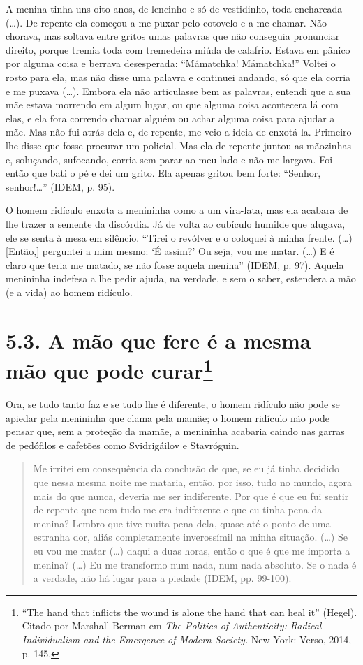 A menina tinha uns oito anos, de lencinho e só de vestidinho, toda
encharcada (\ldots{}). De repente ela começou a me puxar pelo cotovelo e
a me chamar. Não chorava, mas soltava entre gritos umas palavras que não
conseguia pronunciar direito, porque tremia toda com tremedeira miúda de
calafrio. Estava em pânico por alguma coisa e berrava desesperada:
``Mámatchka! Mámatchka!'' Voltei o rosto para ela, mas não disse uma
palavra e continuei andando, só que ela corria e me puxava (\ldots{}).
Embora ela não articulasse bem as palavras, entendi que a sua mãe estava
morrendo em algum lugar, ou que alguma coisa acontecera lá com elas, e
ela fora correndo chamar alguém ou achar alguma coisa para ajudar a mãe.
Mas não fui atrás dela e, de repente, me veio a ideia de enxotá-la.
Primeiro lhe disse que fosse procurar um policial. Mas ela de repente
juntou as mãozinhas e, soluçando, sufocando, corria sem parar ao meu
lado e não me largava. Foi então que bati o pé e dei um grito. Ela
apenas gritou bem forte: ``Senhor, senhor!\ldots{}'' (IDEM, p. 95).

O homem ridículo enxota a menininha como a um vira-lata, mas ela acabara
de lhe trazer a semente da discórdia. Já de volta ao cubículo humilde
que alugava, ele se senta à mesa em silêncio. ``Tirei o revólver e o
coloquei à minha frente. (\ldots{}) {[}Então,{]} perguntei a mim mesmo:
`É assim?' Ou seja, vou me matar. (\ldots{}) E é claro que teria me
matado, se não fosse aquela menina'' (IDEM, p. 97). Aquela menininha
indefesa a lhe pedir ajuda, na verdade, e sem o saber, estendera a mão
(e a vida) ao homem ridículo.

\section{5.3. A mão que fere é a mesma mão que pode curar\protect\footnote{``The hand that inflicts the wound is alone the hand that can heal it'' (Hegel). Citado por Marshall Berman em \emph{The Politics of Authenticity: Radical Individualism and the Emergence of Modern Society.} New York: Verso, 2014, p. 145.}}

Ora, se tudo tanto faz e se tudo lhe é diferente, o homem ridículo não
pode se apiedar pela menininha que clama pela mamãe; o homem ridículo
não pode pensar que, sem a proteção da mamãe, a menininha acabaria
caindo nas garras de pedófilos e cafetões como Svidrigáilov e
Stavróguin.

\begin{quote}
Me irritei em consequência da conclusão de que, se eu já tinha decidido
que nessa mesma noite me mataria, então, por isso, tudo no mundo, agora
mais do que nunca, deveria me ser indiferente. Por que é que eu fui
sentir de repente que nem tudo me era indiferente e que eu tinha pena da
menina? Lembro que tive muita pena dela, quase até o ponto de uma
estranha dor, aliás completamente inverossímil na minha situação.
(\ldots{}) Se eu vou me matar (\ldots{}) daqui a duas horas, então o que
é que me importa a menina? (\ldots{}) Eu me transformo num nada, num
nada absoluto. Se o nada é a verdade, não há lugar para a piedade (IDEM,
pp. 99-100).
\end{quote}

